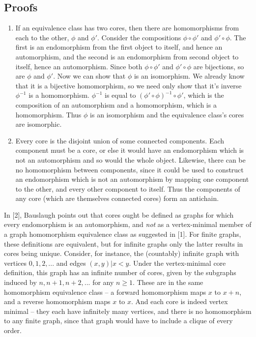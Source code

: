 \documentclass{article}
\def \compose {\circ}
\begin{document}
\subsection{Proofs}
\begin{enumerate}
\item If an equivalence class has two cores, then there are
  homomorphisms from each to the other, $\phi$ and $\phi'$. Consider
  the compositions $\phi \compose \phi'$ and $\phi' \compose
  \phi$. The first is an endomorphism from the first object to itself,
  and hence an automorphism, and the second is an endomorphism from
  second object to itself, hence an automorphism. Since both $\phi
  \compose \phi'$ and $\phi' \compose \phi$ are bijections, so are
  $\phi$ and $\phi'$. Now we can show that $\phi$ is an
  isomorphism. We already know that it is a bijective homomorphism, so
  we need only show that it's inverse $\phi^{-1}$ is a homomorphism.
  $\phi^{-1}$ is equal to $(\phi' \compose \phi)^{-1} \compose \phi'$,
  which is the composition of an automorphism and a homomorphism,
  which is a homomorphism. Thus $\phi$ is an isomorphism and the
  equivalence class's cores are isomorphic.
\item Every core is the disjoint union of some connected
  components. Each component must be a core, or else it would have an
  endomorphism which is not an automorphism and so would the whole
  object. Likewise, there can be no homomorphism between components,
  since it could be used to construct an endomorphism which is not an
  automorphism by mapping one component to the other, and every other
  component to itself. Thus the components of any core (which are
  themselves connected cores) form an antichain.
\end{enumerate}

In [2], Bauslaugh points out that cores ought be defined as graphs for
which every endomorphism is an automorphism, and \emph{not} as a
vertex-minimal member of a graph homomorphism equivalence class as
suggested in [1]. For finite graphs, these definitions are equivalent,
but for infinite graphs only the latter results in cores being
unique. Consider, for instance, the (countably) infinite graph with
vertices ${0, 1, 2, ...}$ and edges ${(x, y) | x < y}$. Under the
vertex-minimal core definition, this graph has an infinite number of
cores, given by the subgraphs induced by ${n, n+1, n+2, ...}$ for any
$n \geq 1$. These are in the same homomorphism equivalence class -- a
forward homomorphism maps $x$ to $x + n$, and a reverse homomorphism
maps $x$ to $x$. And each core is indeed vertex minimal -- they each
have infinitely many vertices, and there is no homomorphism to any
finite graph, since that graph would have to include a clique of every
order.
\end{document}
